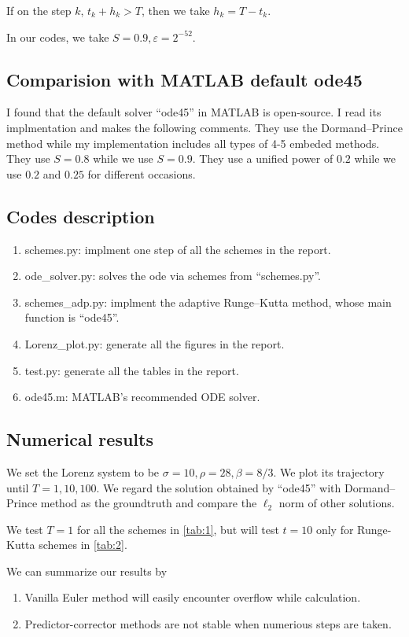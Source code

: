 \documentclass[conference,onecolumn,12pt]{IEEEtran}
\begin{document}
If on the step $k$, $t_k+h_k>T$, then we take $h_k=T-t_k$.

In our codes, we take $S=0.9, \varepsilon=2^{-52}$.

\subsection{Comparision with MATLAB default ode45}
I found that the default solver ``ode45'' in MATLAB is open-source. I read its implmentation and makes the following comments. They use the Dormand–Prince method while my implementation includes all types of 4-5 embeded methods. They use $S=0.8$ while we use $S=0.9$. They use a unified power of $0.2$ while we use $0.2$ and $0.25$ for different occasions.


\subsection{Codes description}
\begin{enumerate}
  \item schemes.py: implment one step of all the schemes in the report.
  \item ode\_solver.py: solves the ode via schemes from ``schemes.py''.
  \item schemes\_adp.py: implment the adaptive Runge–Kutta method, whose main function is ``ode45''.
  \item Lorenz\_plot.py: generate all the figures in the report.
  \item test.py: generate all the tables in the report.
  \item ode45.m: MATLAB's recommended ODE solver.
\end{enumerate}
\subsection{Numerical results}
We set the Lorenz system to be $\sigma = 10, \rho=28, \beta=8/3$. We plot its trajectory until $T=1,10,100$. We regard the solution obtained by ``ode45'' with Dormand–Prince method as the groundtruth and compare the $\ell_2$ norm of other solutions. 

We test $T=1$ for all the schemes in \ref{tab:1}, but will test $t=10$ only for Runge-Kutta schemes in \ref{tab:2}. 

We can summarize our results by
\begin{enumerate}
  \item Vanilla Euler method will easily encounter overflow while calculation.
  \item Predictor-corrector methods are not stable when numerious steps are taken.
\end{enumerate}
\end{document}
